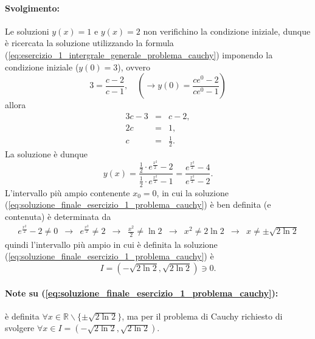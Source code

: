 \begin{example}
    \paragraph{Svolgimento:} Le soluzioni $y(x)=1$ e $y(x)=2$ non verifichino la condizione iniziale, dunque è ricercata la soluzione utilizzando la formula (\ref{eq:esercizio_1_intergrale_generale_problema_cauchy}) imponendo la condizione iniziale ($y(0)=3$), ovvero
    \begin{equation*}
        3=\frac{c-2}{c-1},\quad \left(\rightarrow y(0)=\frac{ce^0-2}{ce^0-1}\right)
    \end{equation*}
    allora
    \begin{equation*}
        \begin{matrix}
            3c - 3 &=& c-2,\\
            2c &=& 1,\\
            c &=&\frac{1}{2}.
        \end{matrix}
    \end{equation*}
    La soluzione è dunque
    \begin{equation}\label{eq:soluzione_finale_esercizio_1_problema_cauchy}
        y(x)=\frac{\frac{1}{2}\cdot e^{\frac{x^2}{2}}-2}{\frac{1}{2}\cdot e^{\frac{x^2}{2}}-1} = \frac{e^{\frac{x^2}{2}}-4}{e^{\frac{x^2}{2}}-2}.
    \end{equation}
    \footnotemark L'intervallo più ampio contenente $x_0=0$, in cui la soluzione (\ref{eq:soluzione_finale_esercizio_1_problema_cauchy}) è ben definita (e contenuta) è determinata da
    \begin{equation*}
        \begin{matrix}
            e^{\frac{x^2}{2}}-2 \neq 0 &\rightarrow& e^{\frac{x^2}{2}}\neq 2 &\rightarrow& \frac{x^2}{2}\neq\ln 2 &\rightarrow& x^2\neq 2\ln2 &\rightarrow& x\neq\pm \sqrt{2\ln2}
        \end{matrix}
    \end{equation*}
    quindi l'intervallo più ampio in cui è definita la soluzione (\ref{eq:soluzione_finale_esercizio_1_problema_cauchy}) è
    \begin{equation*}
        I=(-\sqrt{2\ln2}, \sqrt{2\ln2})\ni 0.
    \end{equation*}
    
    \paragraph{Note su (\ref{eq:soluzione_finale_esercizio_1_problema_cauchy}):} è definita $\forall x\in\mathbb{R}\backslash\{\pm\sqrt{2\ln 2}\} $, ma per il problema di Cauchy richiesto di svolgere $\forall x\in I=(-\sqrt{2\ln2}, \sqrt{2\ln2})$.
    

\end{example}
